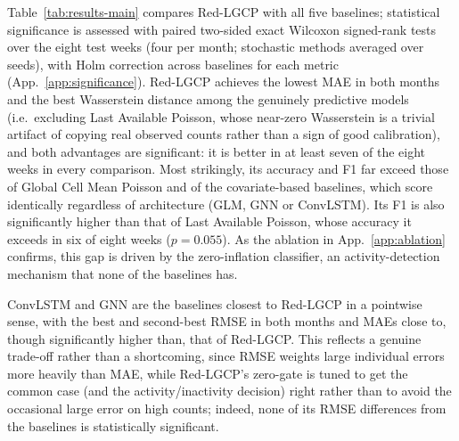 Table~\ref{tab:results-main} compares Red-LGCP with all five baselines; statistical significance is assessed with paired two-sided exact Wilcoxon signed-rank tests over the eight test weeks (four per month; stochastic methods averaged over seeds), with Holm correction across baselines for each metric (App.~\ref{app:significance}). Red-LGCP achieves the lowest MAE in both months and the best Wasserstein distance among the genuinely predictive models (i.e.\ excluding Last Available Poisson, whose near-zero Wasserstein is a trivial artifact of copying real observed counts rather than a sign of good calibration), and both advantages are significant: it is better in at least seven of the eight weeks in every comparison. Most strikingly, its accuracy and F1 far exceed those of Global Cell Mean Poisson and of the covariate-based baselines, which score identically regardless of architecture (GLM, GNN or ConvLSTM). Its F1 is also significantly higher than that of Last Available Poisson, whose accuracy it exceeds in six of eight weeks ($p=0.055$). As the ablation in App.~\ref{app:ablation} confirms, this gap is driven by the zero-inflation classifier, an activity-detection mechanism that none of the baselines has.

ConvLSTM and GNN are the baselines closest to Red-LGCP in a pointwise sense, with the best and second-best RMSE in both months and MAEs close to, though significantly higher than, that of Red-LGCP. This reflects a genuine trade-off rather than a shortcoming, since RMSE weights large individual errors more heavily than MAE, while Red-LGCP's zero-gate is tuned to get the common case (and the activity/inactivity decision) right rather than to avoid the occasional large error on high counts; indeed, none of its RMSE differences from the baselines is statistically significant.
